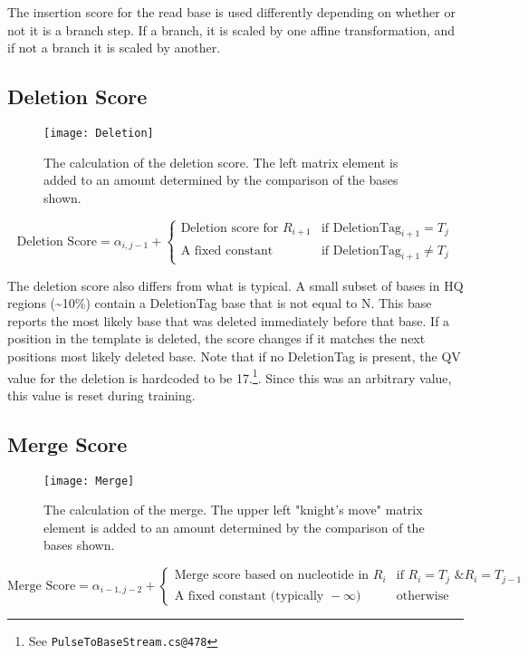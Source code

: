 \documentclass[paper=a4, fontsize=11pt]{scrartcl}
\numberwithin{equation}{section}		%
\numberwithin{figure}{section}			%
\numberwithin{table}{section}				%
\begin{document}
The insertion score for the read base is used differently depending on whether or not it is a branch step.  If a branch, it is scaled by one affine transformation, and if not a branch it is scaled by another.




\subsection{\textbf{Deletion Score}}

\begin{figure}[H] %
	\texttt{[image: Deletion]}
		\caption{The calculation of the deletion score.  The left matrix element is added to an amount determined by the comparison of the bases shown.}				
\end{figure}

\[
	\text{Deletion Score} = \alpha_{i,j-1}  +  \begin{cases}
							 \text{Deletion score  for } R_{i+1}  & \text{if }  \text{DeletionTag}_{i+1} = T_{j} \\
							 \text{A fixed constant} & \text{if }  \text{DeletionTag}_{i+1} \neq T_{j} 
							 \end{cases}
\]

The deletion score also differs from what is typical.  A small subset of bases in HQ regions (\textasciitilde10\%) contain a DeletionTag base that is not equal to N.  This base reports the most likely base that was deleted immediately before that base.  If a position in the template is deleted, the score changes if it matches the next positions most likely deleted base.  Note that if no DeletionTag is present, the QV value for the deletion is hardcoded to be 17.\footnote{See \texttt{PulseToBaseStream.cs@478}}.  Since this was an arbitrary value, this value is reset during training.


\subsection{\textbf{Merge Score}}
\begin{figure}[H] %
	\texttt{[image: Merge]}
		\caption{The calculation of the merge.  The upper left "knight's move" matrix element is added to an amount determined by the comparison of the bases shown.}				
\end{figure}

\[
	\text{Merge Score} = \alpha_{i-1,j-2}  +  \begin{cases}
							 \text{Merge score based on nucleotide in } R_{i}  & \text{if }  R_{i} = T_{j} \text{ \& } R_{i} = T_{j-1} \\
							 \text{A fixed constant (typically }-\infty\text{)} & \text{otherwise}
							 \end{cases}
\]
\end{document}
